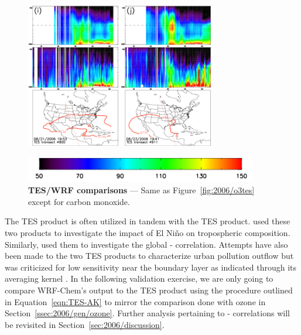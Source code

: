 \begin{figure}
\begin{center}
		\includegraphics[width=1.6in]{co/co_4900_ftuv}
		\includegraphics[width=1.6in]{co/co_4911_ftuv}
		
		\includegraphics[width=4in]{co/co_colorbar}
		\end{center}
	    	\caption[TES/WRF-Chem  comparisons]{\textbf{TES/WRF  comparisons} --- Same as Figure~\ref{fig:2006/o3tes} except for carbon
		monoxide.} \label{fig:2006/cotes}
	\end{figure}

The TES  product is often utilized in tandem with the TES  product. \citet{Logan:2008uq} used these two products to investigate the impact
of El Ni\~no on tropospheric composition. Similarly, \citet{Voulgarakis:2011fk} used them to investigate the global - correlation. Attempts
have also been made to the two TES products to characterize urban pollution outflow but was criticized for low sensitivity near the boundary layer as indicated
through its averaging kernel \citep{Shim:2007kx}. In the following validation exercise, we are only going to compare WRF-Chem's output to the TES 
product using the procedure outlined in Equation~\ref{eqn:TES-AK} to mirror the comparison done with ozone in Section~\ref{ssec:2006/gen/ozone}.  Further
analysis pertaining to - correlations will be revisited in Section~\ref{sec:2006/discussion}.

